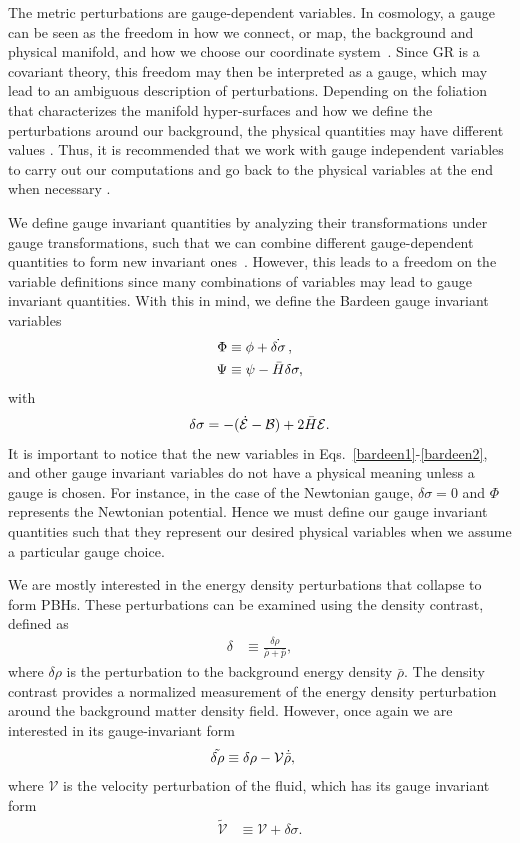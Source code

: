 \documentclass[a4paper,11pt]{article}
\begin{document}
The metric perturbations are gauge-dependent variables. In cosmology, a gauge can be
seen as the freedom in how we connect, or map, the background and physical manifold, and
how we choose our coordinate system~\cite{vitenti2012large}. Since GR is a covariant
theory, this freedom may then be interpreted as a gauge, which may lead to an ambiguous
description of perturbations. Depending on the foliation that characterizes the manifold
hyper-surfaces and how we define the perturbations around our background, the physical
quantities may have different values \cite{covariant_bardeen}. Thus, it is recommended
that we work with gauge independent variables to carry out our computations and go back
to the physical variables at the end when necessary \cite{mukhanov2005physical}.

We define gauge invariant quantities by analyzing their transformations under gauge transformations, such that we can combine different gauge-dependent quantities to form new invariant ones~\cite{covariant_bardeen}. However, this leads to a freedom on the variable definitions since many combinations of variables may lead to gauge invariant quantities. With this in mind, we define the Bardeen gauge invariant variables~\cite{Bardeen1980}
\begin{align}
	\label{bardeen1}
	\Phi & \equiv \phi + \dot{\delta \sigma}\, , \\
	\label{bardeen2}
	\Psi & \equiv \psi - \Bar{H}\delta \sigma
	,\end{align}
with
\begin{align}
	\delta\sigma = -(\dot{\mathcal{E}} - \mathcal{B}) + {2 \Bar{H}\mathcal{E}}
	.\end{align}
It is important to notice that the new variables in
Eqs.~\eqref{bardeen1}-\eqref{bardeen2}, and other gauge invariant variables do not have
a physical meaning unless a gauge is chosen. For instance, in the case of the Newtonian
gauge, $\delta\sigma = 0$ and $\Phi$ represents the Newtonian potential. Hence we must
define our gauge invariant quantities such that they represent our desired physical
variables when we assume a particular gauge choice.

We are mostly interested in the energy density perturbations that collapse to form PBHs.
These perturbations can be examined using the density contrast, defined as
\begin{align}
	\label{densitycon}
	\delta & \equiv \frac{\delta \rho}{\bar{\rho} + \bar{p}}
	,\end{align}
where $\delta\rho$ is the perturbation to the background energy density $\bar\rho$. The
density contrast provides a normalized measurement of the energy density perturbation
around the background matter density field. However, once again we are interested in its
gauge-invariant form
\begin{align}
	\label{deltarhoinvariant}
	\tilde{\delta\rho} & \equiv \delta\rho - \mathcal{V} \dot{\Bar{\rho}}
	,\end{align}
where $\mathcal{V}$ is the velocity perturbation of the fluid, which has its gauge
invariant form
\begin{align}
	\tilde{\mathcal{V}} & \equiv \mathcal{V} + \delta\sigma
	.\end{align}
\end{document}
